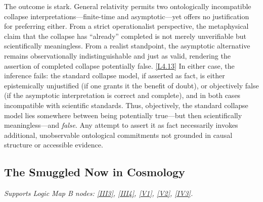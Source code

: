 \documentclass[12pt]{book}
\newcounter{logicanchor}
\newenvironment{logicanchorenv}[1]{\refstepcounter{logicanchor}\label{#1}}{}
\newcommand{\logiclink}[2]{\begin{logicanchorenv}{logic:#1}\end{logicanchorenv}\hyperref[appendix:#1]{[#1]}\xspace}
\begin{document}
The outcome is stark. General relativity permits two ontologically incompatible collapse interpretations---finite-time and asymptotic---yet offers no justification for preferring either. From a strict operationalist perspective, the metaphysical claim that the collapse has ``already'' completed is not merely unverifiable but scientifically meaningless. From a realist standpoint, the asymptotic alternative remains observationally indistinguishable and just as valid, rendering the assertion of completed collapse potentially false. \logiclink{L4.13}{} In either case, the inference fails: the standard collapse model, if asserted as fact, is either epistemically unjustified (if one grants it the benefit of doubt), or objectively false (if the asymptotic interpretation is correct and complete), and in both cases incompatible with scientific standards. Thus, objectively, the standard collapse model lies somewhere between being potentially true---but then scientifically meaningless---and \textit{false}. Any attempt to assert it as fact necessarily invokes additional, unobservable ontological commitments not grounded in causal structure or accessible evidence.

\subsection{The Smuggled Now in Cosmology}\label{sec:4.3.2}
\noindent\textit{Supports Logic Map B nodes: \hyperref[appendix:III3]{[III3]}, \hyperref[appendix:III4]{[III4]}, \hyperref[appendix:V1]{[V1]}, \hyperref[appendix:V2]{[V2]}, \hyperref[appendix:IV3]{[IV3]}.}

\vspace{4pt}
\end{document}
